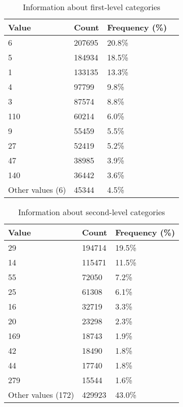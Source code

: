 \begin{table}[h]
	\centering
	\caption{Information about first-level categories}
	\label{lvl1}
	\begin{tabular}{|l|l|l|l|}
		\hline
	\textbf{Value }             & \textbf{Count}  & \textbf{Frequency} (\%) \\ \hline
		6                & 207695 & 20.8\%           \\ \hline
		5                & 184934 & 18.5\%           \\ \hline
		1                & 133135 & 13.3\%           \\ \hline
		4                & 97799  & 9.8\%            \\ \hline
		3                & 87574  & 8.8\%           \\ \hline
		110              & 60214  & 6.0\%            \\ \hline
		9                & 55459  & 5.5\%            \\ \hline
		27               & 52419  & 5.2\%            \\ \hline
		47               & 38985  & 3.9\%            \\ \hline
		140              & 36442  & 3.6\%           \\ \hline
		Other values (6) & 45344  & 4.5\%            \\ \hline
	\end{tabular}
\end{table}


\begin{table}[H]
	\centering
	\caption{Information about second-level categories}
	\label{my-label}
	\begin{tabular}{|l|l|l|}
		\hline
		\textbf{Value }             & \textbf{Count}  & \textbf{Frequency} (\%) \\ \hline
		29                 & 194714 & 19.5\%         \\ \hline
		14                 & 115471 & 11.5\%         \\ \hline
		55                 & 72050  & 7.2\%          \\ \hline
		25                 & 61308  & 6.1\%          \\ \hline
		16                 & 32719  & 3.3\%          \\ \hline
		20                 & 23298  & 2.3\%          \\ \hline
		169                & 18743  & 1.9\%          \\ \hline
		42                 & 18490  & 1.8\%          \\ \hline
		44                 & 17740  & 1.8\%          \\ \hline
		279                & 15544  & 1.6\%          \\ \hline
		Other values (172) & 429923 & 43.0\%         \\ \hline
	\end{tabular}
\end{table}


